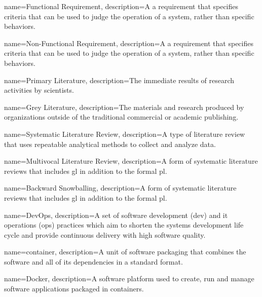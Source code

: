 {
    name={Functional Requirement},
    description={A a requirement that specifies criteria that can be used to judge the operation of a system, rather than specific behaviors.}
}


{
    name={Non-Functional Requirement},
    description={A a requirement that specifies criteria that can be used to judge the operation of a system, rather than specific behaviors.}
}


{
    name={Primary Literature},
    description={The immediate results of research activities by scientists.}
}

{
    name={Grey Literature},
    description={The materials and research produced by organizations outside of the traditional commercial or academic publishing.}
}

{
    name={Systematic Literature Review},
    description={A type of literature review that uses repeatable analytical methods to collect and analyze data.}
}

{
    name={Multivocal Literature Review},
    description={A form of systematic literature reviews that includes \gls{gl} in addition to the formal \gls{pl}.}
}

{
    name={Backward Snowballing},
    description={A form of systematic literature reviews that includes \gls{gl} in addition to the formal \gls{pl}.}
}

{
    name={DevOps},
    description={A set of software development (dev) and it operations (ops) practices which aim to shorten the systems development life cycle and provide continuous delivery with high software quality.}
}

{
    name={container},
    description={A unit of software packaging that combines the software and all of its dependencies in a standard format.}
}

{
    name={Docker},
    description={A software platform used to create, run and manage software applications packaged in \glspl{container}.}
}

